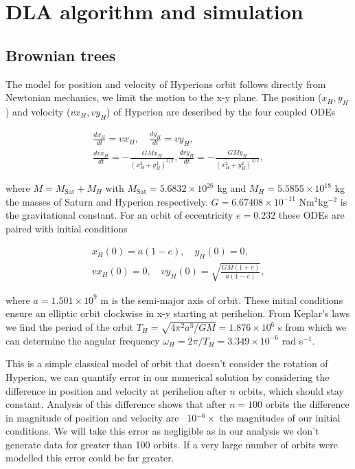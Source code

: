 \documentclass[10pt, twocolumn]{article} %
\begin{document}
\section*{DLA algorithm and simulation}

\subsection*{Brownian trees}

The model for position and velocity of Hyperions orbit follows directly from Newtonian mechanics, we limit the motion to the x-y plane. The position ($x_H, y_H$) and velocity ($vx_H, vy_H$) of Hyperion are described by the four coupled ODEs

\begin{gather}
\label{position_ODEs}
  \frac{d x_{H}}{d t}=v x_{H},\quad \frac{d y_{H}}{d t}=v y_{H},\\
  \frac{d v x_{H}}{d t}=-\frac{G M x_{H}}{\left(x_{H}^{2}+y_{H}^{2}\right)^{3 / 2}}, \frac{d v y_{H}}{d t}=-\frac{G M y_{H}}{\left(x_{H}^{2}+y_{H}^{2}\right)^{3 / 2}},
\end{gather}

where $M = M_\text{Sat} + M_H$ with $M_\text{Sat} = 5.6832 \times 10^{26}$ kg and $M_H = 5.5855 \times 10^{18}$ kg the masses of Saturn and Hyperion respectively. $G = 6.67408 \times 10^{-11}$ Nm$^2$kg$^{-2}$ is the gravitational constant. For an orbit of eccentricity $e = 0.232$ these ODEs are paired with initial conditions

\begin{gather}
\label{position_ICs}
  x_H(0) = a(1-e), \quad y_H(0) = 0,\\
  vx_H(0) = 0, \quad vy_H(0) = \sqrt{\frac{GM(1+e)}{a(1-e)}},
\end{gather}

where $a = 1.501 \times 10^9$ m is the semi-major axis of orbit. These initial conditions ensure an elliptic orbit clockwise in x-y starting at perihelion. From Keplar's laws we find the period of the orbit $T_H = \sqrt{4\pi^2a^3/GM} = 1.876\times10^6$ s from which we can determine the angular frequency $\omega_H = 2\pi/T_H = 3.349\times10^{-6}$ rad s$^{-1}$.

This is a simple classical model of orbit that doesn't consider the rotation of Hyperion, we can quantify error in our numerical solution by considering the difference in position and velocity at perihelion after $n$ orbits, which should stay constant. Analysis of this difference shows that after $n=100$ orbits the difference in magnitude of position and velocity are ~10$^{-6} \times$ the magnitudes of our initial conditions. We will take this error as negligible as in our analysis we don't generate data for greater than 100 orbits. If a very large number of orbits were modelled this error could be far greater.
\end{document}
